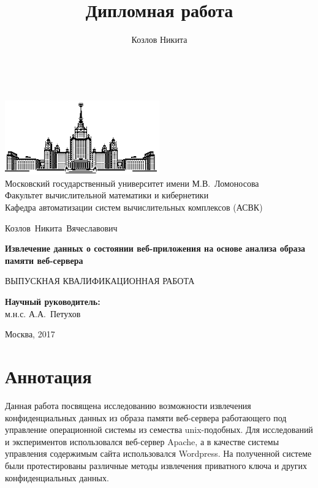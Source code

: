 \documentclass[20pt]{article}
\title{Дипломная работа}
\author{Козлов Никита}
\begin{document}
\thispagestyle{empty}

\begin{center}
\ \vspace{-4cm}

\includegraphics[width=0.5\textwidth]{msu}\\
{Московский государственный университет имени М.В.~Ломоносова}\\
Факультет вычислительной математики и кибернетики\\
Кафедра автоматизации систем вычислительных комплексов (АСВК)

\vspace{5cm}

{\Large Козлов~Никита~Вячеславович}

\vspace{1cm}

{\Large\bfseries
Извлечение данных о состоянии веб-приложения на основе анализа образа памяти веб-сервера\\ }

\vspace{1cm}

{\large ВЫПУСКНАЯ КВАЛИФИКАЦИОННАЯ РАБОТА}
\end{center}

\vfill

\begin{flushright}
  \textbf{Научный руководитель:}\\
  м.н.с. А.А.~Петухов
\end{flushright}

\vfill

\begin{center}
Москва, 2017
\end{center}

\enlargethispage{4\baselineskip}

\newpage

\section*{Аннотация}
Данная работа посвящена исследованию возможности извлечения конфиденциальных
данных из образа памяти веб-сервера работающего под управление операционной
системы из семества unix-подобных. Для исследований и экспериментов использовался
веб-сервер Apache, а в качестве системы управления содержимым сайта использовался
Wordpress. На полученной системе были протестированы различные методы извлечения
приватного ключа и других конфиденциальных данных.
\end{document}
